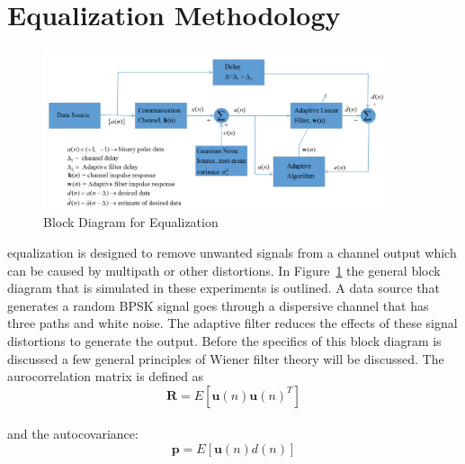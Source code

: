 \documentclass[journal]{IEEEtran}
\begin{document}


\section{Equalization Methodology}
\begin{figure}
  \centering
  \captionsetup{justification=centering}
  \includegraphics[width=0.90\textwidth] {Plots/BlockDiagram}
  \caption{Block Diagram for Equalization}
    \label{fig:BLOCK}
\end{figure}
 equalization is designed to remove unwanted signals from
a channel output which can be caused by multipath or other distortions. In Figure~\ref{fig:BLOCK} the
general block diagram that is simulated in these experiments is outlined. A data source that
generates a random BPSK signal goes through a dispersive channel that has three paths and white noise.
The adaptive filter reduces the effects of these signal distortions to generate the output.
Before the specifics of this block diagram is discussed a few general principles of
Wiener filter theory will be discussed. The aurocorrelation matrix is defined as
$$\boldsymbol{R} = E[\boldsymbol{u}(n)\boldsymbol{u}(n)^T] $$
\\
and the autocovariance:
$$\boldsymbol{p} = E[\boldsymbol{u}(n)d(n)]$$
\end{document}
